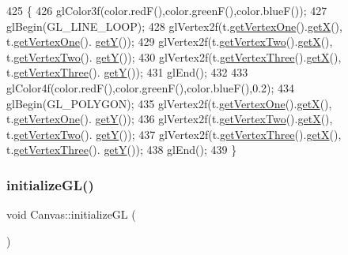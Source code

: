 \begin{DoxyCode}
425 \{
426     glColor3f(color.redF(),color.greenF(),color.blueF());
427     glBegin(GL\_LINE\_LOOP);
428     glVertex2f(t.\hyperlink{class_triangle_a88a35d0b66c9636a9be88adc88d003aa}{getVertexOne}().\hyperlink{class_point_a29c44ec7c7279e02629645a06cdaf7d5}{getX}(), t.\hyperlink{class_triangle_a88a35d0b66c9636a9be88adc88d003aa}{getVertexOne}().
      \hyperlink{class_point_a2371ffadbe245d12a8f556d0a976521b}{getY}());
429     glVertex2f(t.\hyperlink{class_triangle_ac1ae7463f829bcf377fd926b1ad10cac}{getVertexTwo}().\hyperlink{class_point_a29c44ec7c7279e02629645a06cdaf7d5}{getX}(), t.\hyperlink{class_triangle_ac1ae7463f829bcf377fd926b1ad10cac}{getVertexTwo}().
      \hyperlink{class_point_a2371ffadbe245d12a8f556d0a976521b}{getY}());
430     glVertex2f(t.\hyperlink{class_triangle_aed6ceca804b35da95d3d3c930de41e91}{getVertexThree}().\hyperlink{class_point_a29c44ec7c7279e02629645a06cdaf7d5}{getX}(), t.\hyperlink{class_triangle_aed6ceca804b35da95d3d3c930de41e91}{getVertexThree}().
      \hyperlink{class_point_a2371ffadbe245d12a8f556d0a976521b}{getY}());
431     glEnd();
432 
433     glColor4f(color.redF(),color.greenF(),color.blueF(),0.2);
434     glBegin(GL\_POLYGON);
435     glVertex2f(t.\hyperlink{class_triangle_a88a35d0b66c9636a9be88adc88d003aa}{getVertexOne}().\hyperlink{class_point_a29c44ec7c7279e02629645a06cdaf7d5}{getX}(), t.\hyperlink{class_triangle_a88a35d0b66c9636a9be88adc88d003aa}{getVertexOne}().
      \hyperlink{class_point_a2371ffadbe245d12a8f556d0a976521b}{getY}());
436     glVertex2f(t.\hyperlink{class_triangle_ac1ae7463f829bcf377fd926b1ad10cac}{getVertexTwo}().\hyperlink{class_point_a29c44ec7c7279e02629645a06cdaf7d5}{getX}(), t.\hyperlink{class_triangle_ac1ae7463f829bcf377fd926b1ad10cac}{getVertexTwo}().
      \hyperlink{class_point_a2371ffadbe245d12a8f556d0a976521b}{getY}());
437     glVertex2f(t.\hyperlink{class_triangle_aed6ceca804b35da95d3d3c930de41e91}{getVertexThree}().\hyperlink{class_point_a29c44ec7c7279e02629645a06cdaf7d5}{getX}(), t.\hyperlink{class_triangle_aed6ceca804b35da95d3d3c930de41e91}{getVertexThree}().
      \hyperlink{class_point_a2371ffadbe245d12a8f556d0a976521b}{getY}());
438     glEnd();
439 \}
\end{DoxyCode}
\mbox{\label{class_canvas_a68622ac24f847a47270c4e6f566eec3c}} 
\subsubsection{\texorpdfstring{initialize\+G\+L()}{initializeGL()}}
{\footnotesize\ttfamily void Canvas\+::initialize\+GL (\begin{DoxyParamCaption}{ }\end{DoxyParamCaption})}



